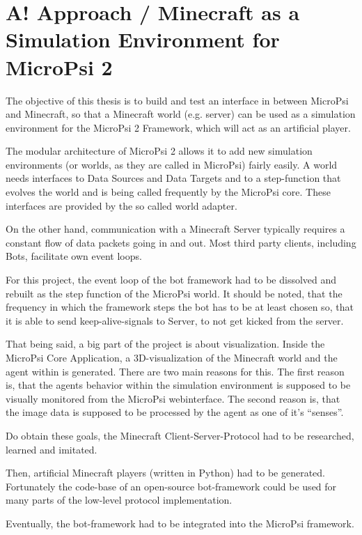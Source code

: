 \chapter{A! Approach / Minecraft as a Simulation Environment for MicroPsi 2}

The objective of this thesis is to build and test an interface in between MicroPsi and Minecraft, so that a Minecraft world (e.g. server) can be used as a simulation environment for the MicroPsi 2 Framework, which will act as an artificial player.

The modular architecture of MicroPsi 2 allows it to add new simulation environments (or worlds, as they are called in MicroPsi) fairly easily. A world needs interfaces to Data Sources and Data Targets and to a step-function that evolves the world and is being called frequently by the MicroPsi core. These interfaces are provided by the so called world adapter. 

On the other hand, communication with a Minecraft Server typically requires a constant flow of data packets going in and out. Most third party clients, including Bots, facilitate own event loops. 

For this project, the event loop of the bot framework had to be dissolved and rebuilt as the step function of the MicroPsi world. It should be noted, that the frequency in which the framework steps the bot has to be at least chosen so, that it is able to send keep-alive-signals to Server, to not get kicked from the server.

That being said, a big part of the project is about visualization. Inside the MicroPsi Core Application, a 3D-visualization of the Minecraft world and the agent within is generated. There are two main reasons for this. The first reason is, that the agents behavior within the simulation environment is supposed to be visually monitored from the MicroPsi webinterface. The second reason is, that the image data is supposed to be processed by the agent as one of it's ``senses''.

Do obtain these goals, the Minecraft Client-Server-Protocol had to be researched, learned and imitated.

Then, artificial Minecraft players (written in Python) had to be generated. Fortunately the code-base of an open-source bot-framework could be used for many parts of the low-level protocol implementation.

Eventually, the bot-framework had to be integrated into the MicroPsi framework.


